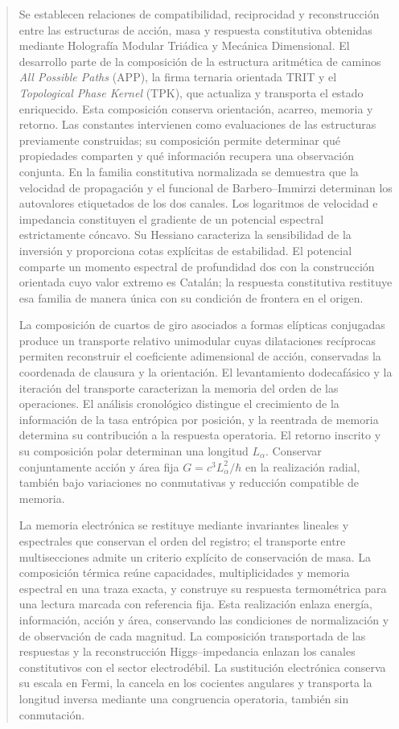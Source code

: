 \begin{abstract}
Se establecen relaciones de compatibilidad, reciprocidad y reconstrucción
entre las estructuras de acción, masa y respuesta constitutiva obtenidas
mediante Holografía Modular Triádica y Mecánica Dimensional. El desarrollo
parte de la composición de la estructura aritmética de caminos
\emph{All Possible Paths} (APP), la firma ternaria orientada TRIT y el
\emph{Topological Phase Kernel} (TPK), que actualiza y transporta el estado
enriquecido. Esta composición conserva orientación, acarreo, memoria y
retorno. Las constantes intervienen como evaluaciones de las
estructuras previamente construidas; su composición permite determinar qué
propiedades comparten y qué información recupera una observación conjunta.
En la familia constitutiva normalizada se demuestra que la velocidad de
propagación y el funcional de Barbero--Immirzi determinan los autovalores
etiquetados de los dos canales. Los logaritmos de velocidad e impedancia
constituyen el gradiente de un potencial espectral estrictamente cóncavo.
Su Hessiano caracteriza la sensibilidad de la inversión y proporciona cotas
explícitas de estabilidad. El potencial comparte un momento espectral de
profundidad dos con la construcción orientada cuyo valor extremo es Catalán;
la respuesta constitutiva restituye esa familia de manera única con su
condición de frontera en el origen.

La composición de cuartos de giro asociados a formas elípticas conjugadas
produce un transporte relativo unimodular cuyas dilataciones recíprocas
permiten reconstruir el coeficiente adimensional de acción, conservadas la
coordenada de clausura y la orientación. El levantamiento dodecafásico y la
iteración del transporte caracterizan la memoria del orden de las
operaciones. El análisis cronológico distingue el crecimiento de la
información de la tasa entrópica por posición, y la reentrada de memoria
determina su contribución a la respuesta operatoria. El retorno inscrito y
su composición polar determinan una longitud $L_\alpha$. Conservar
conjuntamente acción y área fija $G=c^3L_\alpha^2/\hbar$ en la realización
radial, también bajo variaciones no conmutativas y reducción compatible
de memoria.

La memoria electrónica se restituye mediante invariantes lineales y
espectrales que conservan el orden del registro; el transporte entre
multisecciones admite un criterio explícito de conservación de masa.
La composición térmica reúne capacidades, multiplicidades y memoria
espectral en una traza exacta, y construye su respuesta termométrica
para una lectura marcada con referencia fija. Esta realización enlaza
energía, información, acción y área, conservando las condiciones de
normalización y de observación de cada magnitud.
La composición transportada de las respuestas y la reconstrucción
Higgs--impedancia enlazan los canales constitutivos con el sector
electrodébil. La sustitución electrónica conserva su escala en Fermi,
la cancela en los cocientes angulares y transporta la longitud inversa
mediante una congruencia operatoria, también sin conmutación.


\end{abstract}
